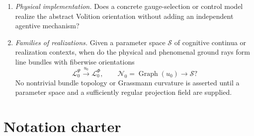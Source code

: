 \documentclass[11pt,reqno]{scrartcl}
\DeclareMathOperator{\Graph}{Graph}
\theoremstyle{plain}
\theoremstyle{definition}
\theoremstyle{remark}
\begin{document}
\begin{enumerate}[label=(\roman*)]
  justified operations implement those restrictions?
  \item \emph{Physical implementation.}  Does a concrete gauge-selection or
  control model realize the abstract Volition orientation without adding an
  independent agentive mechanism?
  \item \emph{Families of realizations.}  Given a parameter space $\mathcal S$
  of cognitive continua or realization contexts, when do the physical and
  phenomenal ground rays form line bundles with fiberwise orientations
  \begin{equation}
    \mathscr L_0^{\Psi}
    \xrightarrow{\ u_0\ }
    \mathscr L_0^{\Phi},
    \qquad
    \mathscr N_0=\Graph(u_0)\longrightarrow\mathcal S?
    \label{eq:ground-line-bundle-target}
  \end{equation}
  No nontrivial bundle topology or Grassmann curvature is asserted until a
  parameter space and a sufficiently regular projection field are supplied.
\end{enumerate}

\clearpage
\appendix
\section{Notation charter}
\label{app:notation}
\end{document}
